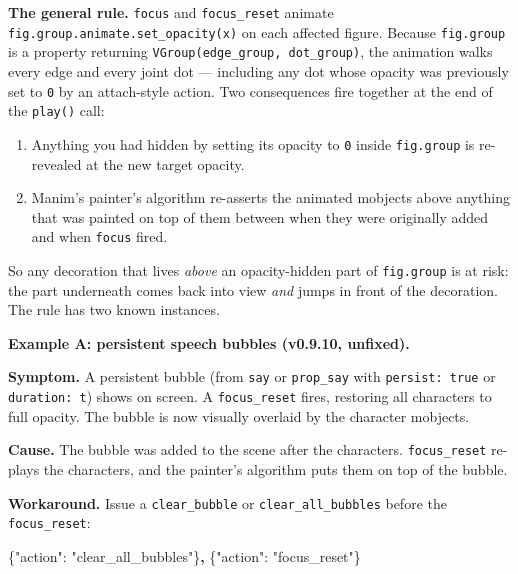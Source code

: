 \documentclass[
  12pt,
  letterpaper,
]{book}
\newenvironment{Shaded}{}{}
\newcommand{\DataTypeTok}[1]{\textcolor[rgb]{0.56,0.13,0.00}{#1}}
\newcommand{\ErrorTok}[1]{\textcolor[rgb]{1.00,0.00,0.00}{\textbf{#1}}}
\newcommand{\FunctionTok}[1]{\textcolor[rgb]{0.02,0.16,0.49}{#1}}
\newcommand{\StringTok}[1]{\textcolor[rgb]{0.25,0.44,0.63}{#1}}
\providecommand{\tightlist}{%
  \setlength{\itemsep}{0pt}\setlength{\parskip}{0pt}}
\begin{document}
\textbf{The general rule.} \texttt{focus} and \texttt{focus\_reset}
animate \texttt{fig.group.animate.set\_opacity(x)} on each affected
figure. Because \texttt{fig.group} is a property returning
\texttt{VGroup(edge\_group,\ dot\_group)}, the animation walks every
edge and every joint dot --- including any dot whose opacity was
previously set to \texttt{0} by an attach-style action. Two consequences
fire together at the end of the \texttt{play()} call:

\begin{enumerate}
\tightlist
\item
  Anything you had hidden by setting its opacity to \texttt{0} inside
  \texttt{fig.group} is re-revealed at the new target opacity.
\item
  Manim's painter's algorithm re-asserts the animated mobjects above
  anything that was painted on top of them between when they were
  originally added and when \texttt{focus} fired.
\end{enumerate}

So any decoration that lives \emph{above} an opacity-hidden part of
\texttt{fig.group} is at risk: the part underneath comes back into view
\emph{and} jumps in front of the decoration. The rule has two known
instances.

\medskip

\textbf{Example A: persistent speech bubbles (v0.9.10, unfixed).}

\textbf{Symptom.} A persistent bubble (from \texttt{say} or
\texttt{prop\_say} with \texttt{persist:\ true} or \texttt{duration:\ t})
shows on screen. A \texttt{focus\_reset} fires, restoring all characters
to full opacity. The bubble is now visually overlaid by the character
mobjects.

\textbf{Cause.} The bubble was added to the scene after the characters.
\texttt{focus\_reset} re-plays the characters, and the painter's
algorithm puts them on top of the bubble.

\textbf{Workaround.} Issue a \texttt{clear\_bubble} or
\texttt{clear\_all\_bubbles} before the \texttt{focus\_reset}:

\begin{Shaded}
\begin{Highlighting}[]
\FunctionTok{\{}\DataTypeTok{"action"}\FunctionTok{:} \StringTok{"clear\_all\_bubbles"}\FunctionTok{\}}\ErrorTok{,}
\FunctionTok{\{}\DataTypeTok{"action"}\FunctionTok{:} \StringTok{"focus\_reset"}\FunctionTok{\}}
\end{Highlighting}
\end{Shaded}
\end{document}
